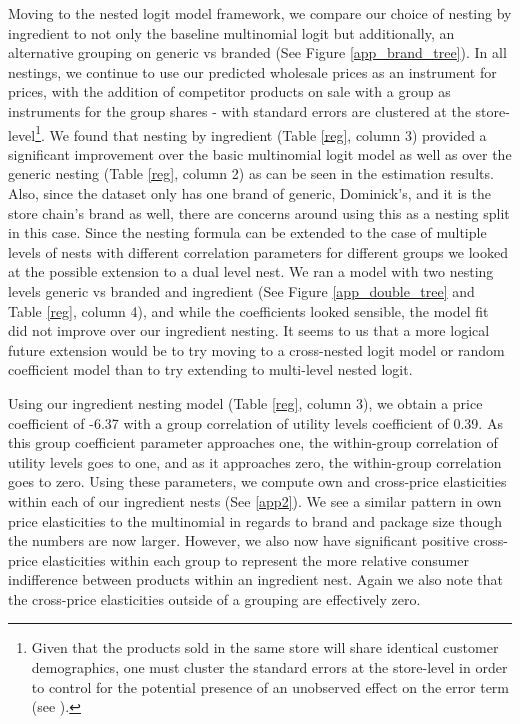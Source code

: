 \documentclass[12pt, authoryear]{elsarticle}
\begin{document}
Moving to the nested logit model framework, we compare our choice of nesting by ingredient to not only the baseline multinomial logit but additionally, an alternative grouping on generic vs branded (See Figure \ref{app_brand_tree}).  In all nestings, we continue to use our predicted wholesale prices as an instrument for prices, with the addition of competitor products on sale with a group as instruments for the group shares - with standard errors are clustered at the store-level\footnote{Given that the products sold in the same store will share identical customer demographics,  one must cluster the standard errors at the store-level in order to control for the potential presence of an unobserved effect on the error term (see \cite{angrist2008mostly}).}.  We found that nesting by ingredient (Table \ref{reg}, column 3) provided a significant improvement over the basic multinomial logit model as well as over the generic nesting (Table \ref{reg}, column 2) as can be seen in the estimation results.  Also, since the dataset only has one brand of generic, Dominick’s, and it is the store chain’s brand as well, there are concerns around using this as a nesting split in this case.  Since the nesting formula can be extended to the case of multiple levels of nests with different correlation parameters for different groups \citep{berry1994estimating} we looked at the possible extension to a dual level nest.  We ran a model with two nesting levels generic vs branded and ingredient (See Figure \ref{app_double_tree} and Table \ref{reg}, column 4), and while the coefficients looked sensible, the model fit did not improve over our ingredient nesting.  It seems to us that a more logical future extension would be to try moving to a cross-nested logit model or random coefficient model than to try extending to multi-level nested logit.

Using our ingredient nesting model (Table \ref{reg}, column 3), we obtain a price coefficient of -6.37 with a group correlation of utility levels coefficient of 0.39.  As this group coefficient parameter approaches one, the within-group correlation of utility levels goes to one, and as it approaches zero, the within-group correlation goes to zero.  Using these parameters, we compute own and cross-price elasticities within each of our ingredient nests (See \ref{app2}).  We see a similar pattern in own price elasticities to the multinomial in regards to brand and package size though the numbers are now larger.  However, we also now have significant positive cross-price elasticities within each group to represent the more relative consumer indifference between products within an ingredient nest.  Again we also note that the cross-price elasticities outside of a grouping are effectively zero.
\end{document}
